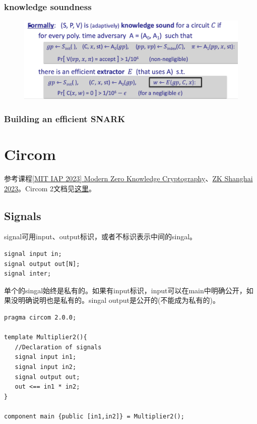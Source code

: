 \documentclass[10pt]{ctexart}
\begin{document}
\subsubsection*{knowledge soundness}

\begin{figure}[H]
    \centering
    \includegraphics[width=1\textwidth]{./img/knowledge_soundness.png} 
\end{figure}

\subsubsection{Building an efficient SNARK}

\section{Circom}
参考课程\href{https://zkiap.com/}{[MIT IAP 2023] Modern Zero Knowledge Cryptography}、\href{https://zkshanghai.xyz/}{ZK Shanghai 2023}。Circom 2文档见\href{https://docs.circom.io/circom-language/signals/}{这里}。

\subsection{Signals}
signal可用input、output标识，或者不标识表示中间的singal。
\begin{lstlisting}
signal input in;
signal output out[N];
signal inter;
\end{lstlisting}
单个的singal始终是私有的。如果有input标识，input可以在main中明确公开，如果没明确说明也是私有的。singal output是公开的(不能成为私有的)。
\begin{lstlisting}
pragma circom 2.0.0;

template Multiplier2(){
   //Declaration of signals
   signal input in1;
   signal input in2;
   signal output out;
   out <== in1 * in2;
}

component main {public [in1,in2]} = Multiplier2();
\end{lstlisting}
\end{document}
